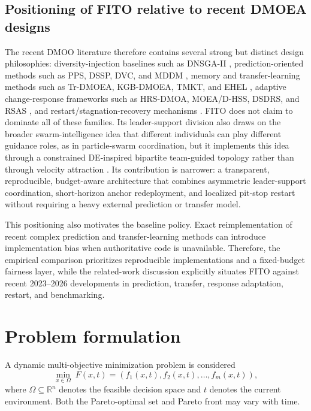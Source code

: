 \documentclass[preprint,12pt]{elsarticle}
\begin{document}
\subsection{Positioning of FITO relative to recent DMOEA designs}

The recent DMOO literature therefore contains several strong but distinct design philosophies: diversity-injection baselines such as DNSGA-II \cite{Deb2007DNSGAII}, prediction-oriented methods such as PPS, DSSP, DVC, and MDDM \cite{Zhou2014Population,Wu2023DSSP,Wu2023DVC,Gao2024MDDM}, memory and transfer-learning methods such as Tr-DMOEA, KGB-DMOEA, TMKT, and EHEL \cite{Jiang2018TrDMOEA,Ye2022KGB,Zhao2025TMKT,Guan2026EHEL}, adaptive change-response frameworks such as HRS-DMOA, MOEA/D-HSS, DSDRS, and RSAS \cite{Li2024HRS,Hu2024HSS,Ma2024DSDRS,Li2024RSAS}, and restart/stagnation-recovery mechanisms \cite{Li2022Restart,Zou2021Stagnation}. FITO does not claim to dominate all of these families. Its leader-support division also draws on the broader swarm-intelligence idea that different individuals can play different guidance roles, as in particle-swarm coordination, but it implements this idea through a constrained DE-inspired bipartite team-guided topology rather than through velocity attraction \cite{Eberhart1995PSO}. Its contribution is narrower: a transparent, reproducible, budget-aware architecture that combines asymmetric leader-support coordination, short-horizon anchor redeployment, and localized pit-stop restart without requiring a heavy external prediction or transfer model.

This positioning also motivates the baseline policy. Exact reimplementation of recent complex prediction and transfer-learning methods can introduce implementation bias when authoritative code is unavailable. Therefore, the empirical comparison prioritizes reproducible implementations and a fixed-budget fairness layer, while the related-work discussion explicitly situates FITO against recent 2023--2026 developments in prediction, transfer, response adaptation, restart, and benchmarking.

\section{Problem formulation}
\label{sec:problem}

A dynamic multi-objective minimization problem is considered
\begin{equation}
\min_{x \in \Omega} \; F(x,t) = \left(f_1(x,t), f_2(x,t), \ldots, f_m(x,t)\right),
\end{equation}
where $\Omega \subseteq \mathbb{R}^{n}$ denotes the feasible decision space and $t$ denotes the current environment. Both the Pareto-optimal set and Pareto front may vary with time.
\end{document}
